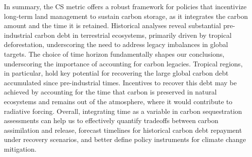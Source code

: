 \documentclass[ProofPDF]{./Styles/Jnls-Template-V3}
\begin{document}
In summary, the CS metric offers a robust framework for policies that incentivize long-term land management to sustain carbon storage, as it integrates the carbon amount and the time it is retained. Historical analyses reveal substantial pre-industrial carbon debt in terrestrial ecosystems, primarily driven by tropical deforestation, underscoring the need to address legacy imbalances in global targets. The choice of time horizon fundamentally shapes our conclusions, underscoring the importance of accounting for carbon legacies. Tropical regions, in particular, hold key potential for recovering the large global carbon debt accumulated since pre-industrial times. Incentives to recover this debt may be achieved by accounting for the time that carbon is preserved in natural ecosystems and remains out of the atmosphere, where it would contribute to radiative forcing. Overall, integrating time as a variable in carbon sequestration assessments can help us to effectively quantify tradeoffs between carbon assimilation and release, forecast timelines for historical carbon debt repayment under recovery scenarios, and better define policy instruments for climate change mitigation.





\end{document}
